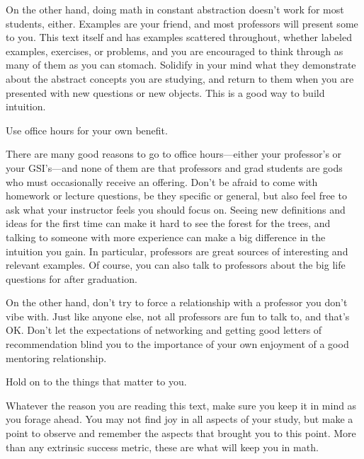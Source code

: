 \documentclass[../notes.tex]{subfiles}
\begin{document}
On the other hand, doing math in constant abstraction doesn't work for most students, either. Examples are your friend, and most professors will present some to you. This text itself and has examples scattered throughout, whether labeled examples, exercises, or problems, and you are encouraged to think through as many of them as you can stomach. Solidify in your mind what they demonstrate about the abstract concepts you are studying, and return to them when you are presented with new questions or new objects. This is a good way to build intuition.
\begin{proposition}
    Use office hours for your own benefit.
\end{proposition}
There are many good reasons to go to office hours---either your professor's or your GSI's---and none of them are that professors and grad students are gods who must occasionally receive an offering. Don't be afraid to come with homework or lecture questions, be they specific or general, but also feel free to ask what your instructor feels you should focus on. Seeing new definitions and ideas for the first time can make it hard to see the forest for the trees, and talking to someone with more experience can make a big difference in the intuition you gain. In particular, professors are great sources of interesting and relevant examples. Of course, you can also talk to professors about the big life questions for after graduation.

On the other hand, don't try to force a relationship with a professor you don't vibe with. Just like anyone else, not all professors are fun to talk to, and that's OK. Don't let the expectations of networking and getting good letters of recommendation blind you to the importance of your own enjoyment of a good mentoring relationship.
\begin{theorem}
    Hold on to the things that matter to you.
\end{theorem}
Whatever the reason you are reading this text, make sure you keep it in mind as you forage ahead. You may not find joy in all aspects of your study, but make a point to observe and remember the aspects that brought you to this point. More than any extrinsic success metric, these are what will keep you in math.
\end{document}
